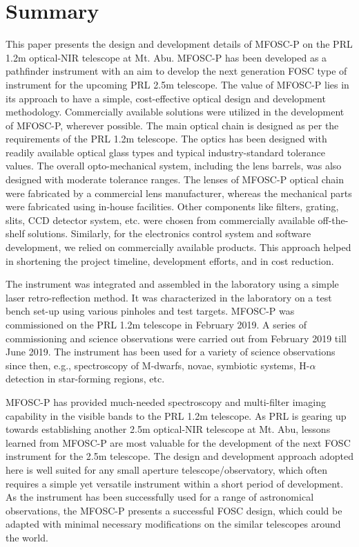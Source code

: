 \par
\section{Summary} 
\label{sec-Summary}
\par

This paper presents the design and development details of MFOSC-P on the PRL 1.2m optical-NIR telescope at Mt. Abu. MFOSC-P has been developed as a pathfinder instrument with an aim to develop the next generation FOSC type of instrument for the upcoming PRL 2.5m telescope. The value of MFOSC-P lies in its approach to have a simple, cost-effective optical design and development methodology. Commercially available solutions were utilized in the development of MFOSC-P, wherever possible. The main optical chain is designed as per the requirements of the PRL 1.2m telescope. The optics has been designed with readily available optical glass types and typical industry-standard tolerance values. The overall opto-mechanical system, including the lens barrels, was also designed with moderate tolerance ranges. The lenses of MFOSC-P optical chain were fabricated by a commercial lens manufacturer, whereas the mechanical parts were fabricated using in-house facilities. Other components like filters, grating, slits, CCD detector system, etc. were chosen from commercially available off-the-shelf solutions. Similarly, for the electronics control system and software development, we relied on commercially available products. This approach helped in shortening the project timeline, development efforts, and in cost reduction. 
\par 
The instrument was integrated and assembled in the laboratory using a simple laser retro-reflection method. It was characterized in the laboratory on a test bench set-up using various pinholes and test targets. MFOSC-P was commissioned on the PRL 1.2m telescope in February 2019. A series of commissioning and science observations were carried out from February 2019 till June 2019. The instrument has been used for a variety of science observations since then, e.g., spectroscopy of M-dwarfs, novae, symbiotic systems, H-$\alpha$ detection in star-forming regions, etc.
\par 
MFOSC-P has provided much-needed spectroscopy and multi-filter imaging capability in the visible bands to the PRL 1.2m telescope. As PRL is gearing up towards establishing another 2.5m optical-NIR telescope at Mt. Abu, lessons learned from MFOSC-P are most valuable for the development of the next FOSC instrument for the 2.5m telescope. The design and development approach adopted here is well suited for any small aperture telescope/observatory, which often requires a simple yet versatile instrument within a short period of development. As the instrument has been successfully used for a range of astronomical observations, the MFOSC-P presents a successful FOSC design, which could be adapted with minimal necessary modifications on the similar telescopes around the world.  


